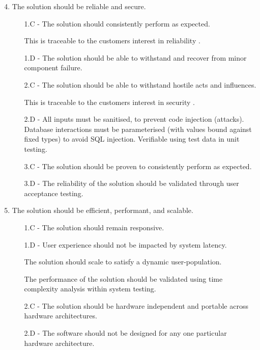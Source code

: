 \documentclass[9pt, titlepage]{extarticle}
\begin{document}
\vspace*{1mm}

\begin{enumerate}[leftmargin=*]
\setcounter{enumi}{3}
\item The solution should be reliable and secure.
\begin{enumerate}[noitemsep, topsep=0pt, leftmargin=9mm]
 \item[1.C -] The solution should consistently perform as expected.
 \item[] This is traceable to the customers interest in reliability \autocite{web:spec}.
 \item[1.D -] The solution should be able to withstand and recover from minor component failure.
 \vspace*{1mm}
 \item[2.C -] The solution should be able to withstand hostile acts and influences.  \item[] This is traceable to the customers interest in security \autocite{web:spec}.
 \item[2.D -] All inputs must be sanitised, to prevent code injection (attacks). Database interactions must be parameterised (with values bound against fixed types) to avoid SQL injection. Verifiable using test data in unit testing.
 \vspace*{1mm}
 \item[3.C -] The solution should be proven to consistently perform as expected.
 \item[3.D -] The reliability of the solution should be validated through user acceptance testing.
\end{enumerate}

\item The solution should be efficient, performant, and scalable. 
\begin{enumerate}[noitemsep, topsep=0pt, leftmargin=9mm]
 \item[1.C -] The solution should remain responsive.
 \item[1.D -] User experience should not be impacted by system latency. 
 \item[] The solution should scale to satisfy a dynamic user-population.
 \item[] The performance of the solution should be validated using time complexity analysis within system testing. 
 \item[2.C -] The solution should be hardware independent and portable across hardware architectures.
 \item[2.D -] The software should not be designed for any one particular hardware architecture.
 

\end{enumerate}
\end{enumerate}
\end{document}
